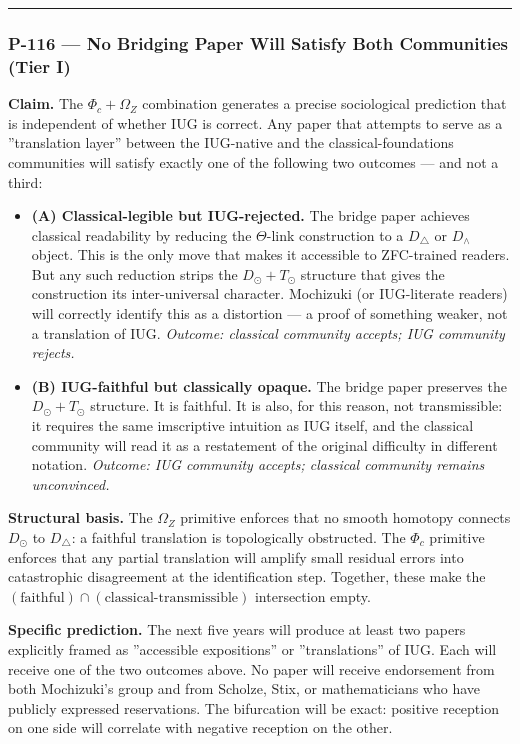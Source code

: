 \documentclass[10pt,a4paper]{article}
\begin{document}
\begin{center}
\rule{0.5\textwidth}{0.4pt}
\end{center}

\subsubsection{P-116 --- No Bridging Paper Will Satisfy Both Communities (Tier I)}

\textbf{Claim.} The $\Phi_c + \Omega_Z$ combination generates a precise sociological prediction
that is independent of whether IUG is correct. Any paper that attempts to serve as a
''translation layer'' between the IUG-native and the classical-foundations communities will
satisfy exactly one of the following two outcomes --- and not a third:

\begin{itemize}
    \item \textbf{(A) Classical-legible but IUG-rejected.} The bridge paper achieves classical readability
by reducing the $\Theta$-link construction to a $D_{\triangle}$ or $D_{\wedge}$ object. This is
the only move that makes it accessible to ZFC-trained readers. But any such reduction strips
the $D_\odot + T_\odot$ structure that gives the construction its inter-universal
character. Mochizuki (or IUG-literate readers) will correctly identify this as a distortion
--- a proof of something weaker, not a translation of IUG. \emph{Outcome: classical community
accepts; IUG community rejects.}
    \item \textbf{(B) IUG-faithful but classically opaque.} The bridge paper preserves the
$D_\odot + T_\odot$ structure. It is faithful. It is also, for this reason,
not transmissible: it requires the same imscriptive intuition as IUG itself, and the
classical community will read it as a restatement of the original difficulty in different
notation. \emph{Outcome: IUG community accepts; classical community remains unconvinced.}
\end{itemize}

\textbf{Structural basis.} The $\Omega_Z$ primitive enforces that no smooth homotopy connects
$D_\odot$ to $D_{\triangle}$: a faithful translation is topologically obstructed. The
$\Phi_c$ primitive enforces that any partial translation will amplify small residual errors
into catastrophic disagreement at the identification step. Together, these make the
$(\text{faithful}) \cap (\text{classical-transmissible})$ intersection empty.

\textbf{Specific prediction.} The next five years will produce at least two papers explicitly
framed as ''accessible expositions'' or ''translations'' of IUG. Each will receive one of the
two outcomes above. No paper will receive endorsement from both Mochizuki's group and from
Scholze, Stix, or mathematicians who have publicly expressed reservations. The bifurcation
will be exact: positive reception on one side will correlate with negative reception on the
other.
\end{document}

